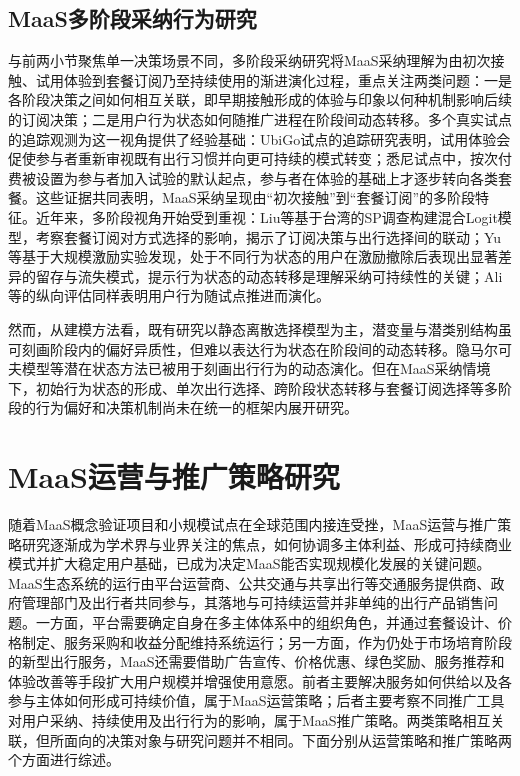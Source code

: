 \subsection{MaaS多阶段采纳行为研究}\label{subsec.review.maas.stage}

与前两小节聚焦单一决策场景不同，多阶段采纳研究将MaaS采纳理解为由初次接触、试用体验到套餐订阅乃至持续使用的渐进演化过程，重点关注两类问题：一是各阶段决策之间如何相互关联，即早期接触形成的体验与印象以何种机制影响后续的订阅决策；二是用户行为状态如何随推广进程在阶段间动态转移。多个真实试点的追踪观测为这一视角提供了经验基础：UbiGo试点的追踪研究表明，试用体验会促使参与者重新审视既有出行习惯并向更可持续的模式转变\citep{sochorTryingOutMobility2016,strombergInvitingTravelersSmorgasbord2018}；悉尼试点中，按次付费被设置为参与者加入试验的默认起点，参与者在体验的基础上才逐步转向各类套餐\citep{hoDriversParticipantsChoices2021,hensherMobilityServicePrivate2021}。这些证据共同表明，MaaS采纳呈现由``初次接触''到``套餐订阅''的多阶段特征。近年来，多阶段视角开始受到重视：Liu等\citep{liuUnderstandingImpactOccasional2023}基于台湾的SP调查构建混合Logit模型，考察套餐订阅对方式选择的影响，揭示了订阅决策与出行选择间的联动；Yu等\citep{yuTransitioningIncentivebasedUser2025}基于大规模激励实验发现，处于不同行为状态的用户在激励撤除后表现出显著差异的留存与流失模式，提示行为状态的动态转移是理解采纳可持续性的关键；Ali等\citep{aliMonitoringEvaluationTravel2025}的纵向评估同样表明用户行为随试点推进而演化。

然而，从建模方法看，既有研究以静态离散选择模型为主，潜变量与潜类别结构虽可刻画阶段内的偏好异质性，但难以表达行为状态在阶段间的动态转移。隐马尔可夫模型等潜在状态方法已被用于刻画出行行为的动态演化\citep{yuHighorderHiddenMarkov2023,yuTransitioningIncentivebasedUser2025}。但在MaaS采纳情境下，初始行为状态的形成、单次出行选择、跨阶段状态转移与套餐订阅选择等多阶段的行为偏好和决策机制尚未在统一的框架内展开研究。

\section{MaaS运营与推广策略研究}\label{sec.review.promo}

随着MaaS概念验证项目和小规模试点在全球范围内接连受挫，MaaS运营与推广策略研究逐渐成为学术界与业界关注的焦点，如何协调多主体利益、形成可持续商业模式并扩大稳定用户基础，已成为决定MaaS能否实现规模化发展的关键问题。MaaS生态系统的运行由平台运营商、公共交通与共享出行等交通服务提供商、政府管理部门及出行者共同参与，其落地与可持续运营并非单纯的出行产品销售问题。一方面，平台需要确定自身在多主体体系中的组织角色，并通过套餐设计、价格制定、服务采购和收益分配维持系统运行；另一方面，作为仍处于市场培育阶段的新型出行服务，MaaS还需要借助广告宣传、价格优惠、绿色奖励、服务推荐和体验改善等手段扩大用户规模并增强使用意愿。前者主要解决服务如何供给以及各参与主体如何形成可持续价值，属于MaaS运营策略；后者主要考察不同推广工具对用户采纳、持续使用及出行行为的影响，属于MaaS推广策略。两类策略相互关联，但所面向的决策对象与研究问题并不相同。下面分别从运营策略和推广策略两个方面进行综述。

